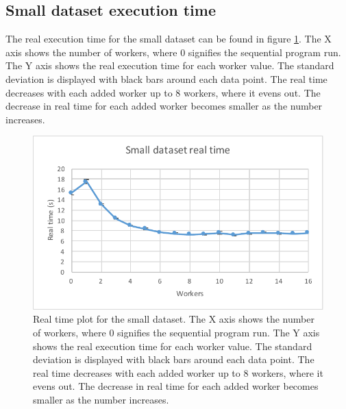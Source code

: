 \subsection{Small dataset execution time}
The real execution time for the small dataset can be found in figure \ref{fig:dataset_2_real_time}.
The X axis shows the number of workers, where 0 signifies the sequential program run.
The Y axis shows the real execution time for each worker value. The standard deviation is displayed with black bars around each data point. The real time
decreases with each added worker up to 8 workers, where it evens out. The decrease in real time for each added worker becomes smaller as the number increases.
\begin{figure}[ht]
  \centering
  \includegraphics[width=120mm]{figures/dataset_2/dataset_2_real_time.pdf}
  \caption[Real time plot for the small dataset.]{Real time plot for the small dataset. The X axis shows the number of workers, where 0 signifies the sequential program run.
  The Y axis shows the real execution time for each worker value. The standard deviation is displayed with black bars around each data point. The real time
  decreases with each added worker up to 8 workers, where it evens out. The decrease in real time for each added worker becomes smaller as the number increases.}
  \label{fig:dataset_2_real_time}
\end{figure}

